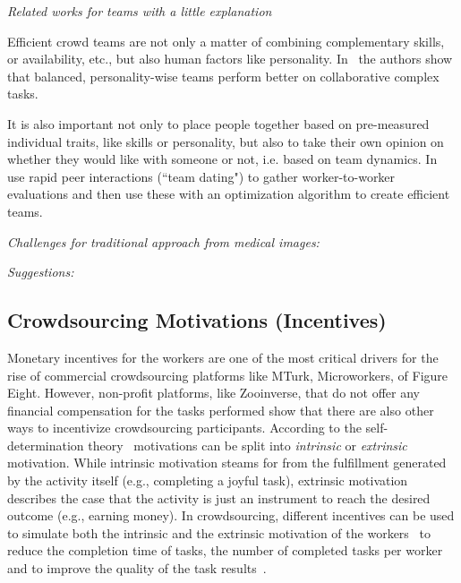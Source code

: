 \documentclass[10pt,twocolumn,letterpaper]{article}
\begin{document}
\emph{Related works for teams with a little explanation}

\cite{Anagnostopoulos2012}

\cite{BalkesenATO13}

Efficient crowd teams are not only a matter of combining complementary skills, or availability, etc., but also human factors like personality. In~\cite{Lykourentzou:2016:PMB:2818048.2819979} the authors show that balanced, personality-wise teams perform better on collaborative complex tasks. 

It is also important not only to place people together based on pre-measured individual traits, like skills or personality, but also to take their own opinion on whether they would like with someone or not, i.e. based on team dynamics. In~\cite{Lykourentzou:2017:TDL:2998181.2998322} use rapid peer interactions (``team dating") to gather worker-to-worker evaluations and then use these with an optimization algorithm to create efficient teams.



\emph{Challenges for traditional approach from medical images:}

\emph{Suggestions:}


\subsection{Crowdsourcing Motivations (Incentives)}
Monetary incentives for the workers are one of the most critical drivers for the rise of commercial crowdsourcing platforms like MTurk, Microworkers, of Figure Eight. 
However, non-profit platforms, like Zooinverse, that do not offer any financial compensation for the tasks performed show that there are also other ways to incentivize crowdsourcing participants.
According to the self-determination theory~\cite{deci1985intrinsic} motivations can be split into \emph{intrinsic} or \emph{extrinsic} motivation.
While intrinsic motivation steams for from the fulfillment generated by the activity itself (e.g., completing a joyful task), extrinsic motivation describes the case that the activity is just an instrument to reach the desired outcome (e.g., earning money).
In crowdsourcing, different incentives can be used to simulate both the intrinsic and the extrinsic motivation of the workers~\cite{kaufmann2011more} to reduce the completion time of tasks, the number of completed tasks per worker and to improve the quality of the task results~\cite{rogstadius2011assessment}. 
\end{document}
